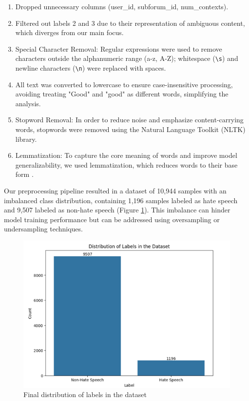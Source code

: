 \documentclass{article}
\begin{document}
\begin{enumerate}
    \item Dropped unnecessary columns (user\_id, subforum\_id, num\_contexts).
    \item Filtered out labels 2 and 3 due to their representation of ambiguous content, which diverges from our main focus.
    \item Special Character Removal: Regular expressions were used to remove characters outside the alphanumeric range (a-z, A-Z); whitespace (\texttt{\textbackslash s}) and newline characters (\texttt{\textbackslash n}) were replaced with spaces.
    \item All text was converted to lowercase to ensure case-insensitive processing, avoiding treating "Good" and "good" as different words, simplifying the analysis.
    \item Stopword Removal: In order to reduce noise and emphasize content-carrying words, stopwords were removed using the Natural Language Toolkit (NLTK) library.
    \item Lemmatization: To capture the core meaning of words and improve model generalizability, we used lemmatization, which reduces words to their base form \cite{lemmatization}.
\end{enumerate}
Our preprocessing pipeline resulted in a dataset of 10,944 samples with an imbalanced class distribution, containing 1,196 samples labeled as hate speech and 9,507 labeled as non-hate speech (Figure \ref{fig:final_distribution}). This imbalance can hinder model training performance but can be addressed using oversampling or undersampling techniques.

\begin{figure}[H]
    \centering
    \includegraphics[width=\linewidth]{figure3.png}
    \caption{Final distribution of labels in the dataset}
    \label{fig:final_distribution}
\end{figure}
\end{document}
